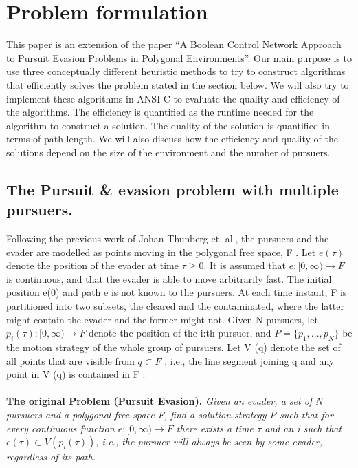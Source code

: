 \chapter{Problem formulation}

This paper is an extension of the paper ``A Boolean Control Network Approach to Pursuit Evasion Problems in Polygonal Environments''\cite{paper1}. Our main purpose is to use three conceptually different heuristic methods to try to construct algorithms that efficiently solves the problem stated in the section below. We will also try to implement these algorithms in ANSI C to evaluate the quality and efficiency of the algorithms. The efficiency is quantified as the runtime needed for the algorithm to construct a solution. The quality of the solution is quantified in terms of path length. We will also discuss how the efficiency and quality of the solutions depend on the size of the environment and the number of pursuers.
\section {The Pursuit \& evasion problem with multiple pursuers.}
Following the previous work of Johan Thunberg  et. al.\cite{paper1}, the pursuers and the evader are modelled as points moving in the polygonal free space, F . Let  $e(\tau )$ denote the position of the evader at time $\tau \geq 0$. It is assumed that $e : \lbrack 0, \infty) \to F$ is continuous, and that the evader is able to move arbitrarily fast. The initial position e(0) and path e is not known to the pursuers. At each time instant, F is partitioned into two subsets, the cleared and the contaminated, where the latter might contain the evader and the former might not. Given N pursuers, let $p_i (\tau ) : \lbrack 0, \infty) \to F$ denote the position of the i:th pursuer, and $P = \lbrace p_1 , . . . , p_N \rbrace$ be the motion strategy of the whole group of pursuers. Let V (q) denote the set of all points that are visible from $q \subset F$ , i.e., the line segment joining q and any point in V (q) is contained in F .\\
\\
\textbf{The original Problem (Pursuit Evasion).} \emph{ Given an evader, a set of N pursuers and a polygonal free space F, find a solution strategy P such that for every continuous function $e : \lbrack 0, \infty) \to F$ there exists a time $\tau$ and an i such that $e(\tau ) \subset V (p_i (\tau ))$, i.e., the pursuer will always be seen by some evader, regardless of its path. }

